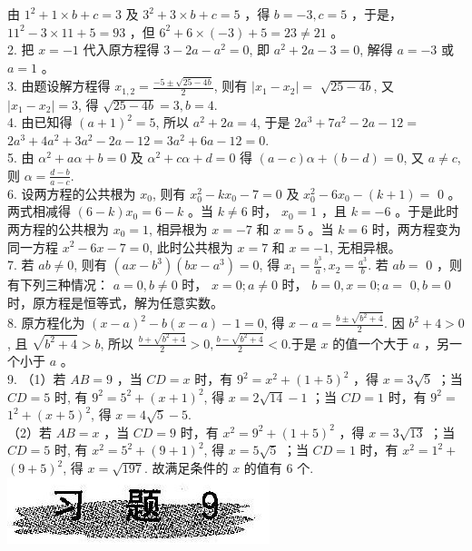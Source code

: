 \documentclass[10pt]{article}
\begin{document}
由 $1^{2}+1 \times b+c=3$ 及 $3^{2}+3 \times b+c=5$ ，得 $b=-3, c=5$ ，于是， $11^{2}-3 \times 11+5=93$ ，但 $6^{2}+6 \times(-3)+5=23 \neq 21$ 。\\
2. 把 $x=-1$ 代入原方程得 $3-2 a-a^{2}=0$, 即 $a^{2}+2 a-3=0$, 解得 $a=-3$ 或 $a=1$ 。\\
3. 由题设解方程得 $x_{1,2}=\frac{-5 \pm \sqrt{25-4 b}}{2}$, 则有 $\left|x_{1}-x_{2}\right|=$ $\sqrt{25-4 b}$, 又 $\left|x_{1}-x_{2}\right|=3$, 得 $\sqrt{25-4 b}=3, b=4$.\\
4. 由已知得 $(a+1)^{2}=5$, 所以 $a^{2}+2 a=4$, 于是 $2 a^{3}+7 a^{2}-2 a-12=$ $2 a^{3}+4 a^{2}+3 a^{2}-2 a-12=3 a^{2}+6 a-12=0$.\\
5. 由 $\alpha^{2}+a \alpha+b=0$ 及 $\alpha^{2}+c \alpha+d=0$ 得 $(a-c) \alpha+(b-d)=0$, 又 $a \neq c$,则 $\alpha=\frac{d-b}{a-c}$.\\
6. 设两方程的公共根为 $x_{0}$, 则有 $x_{0}^{2}-k x_{0}-7=0$ 及 $x_{0}^{2}-6 x_{0}-(k+1)=$ 0 。两式相减得 $(6-k) x_{0}=6-k$ 。当 $k \neq 6$ 时， $x_{0}=1$ ，且 $k=-6$ 。于是此时两方程的公共根为 $x_{0}=1$, 相异根为 $x=-7$ 和 $x=5$ 。当 $k=6$ 时，两方程变为同一方程 $x^{2}-6 x-7=0$, 此时公共根为 $x=7$ 和 $x=-1$, 无相异根。\\
7. 若 $a b \neq 0$, 则有 $\left(a x-b^{3}\right)\left(b x-a^{3}\right)=0$, 得 $x_{1}=\frac{b^{3}}{a}, x_{2}=\frac{a^{3}}{b}$. 若 $a b=$ 0 ，则有下列三种情况： $a=0, b \neq 0$ 时， $x=0 ; a \neq 0$ 时， $b=0, x=0 ; a=$ $0, b=0$ 时，原方程是恒等式，解为任意实数。\\
8. 原方程化为 $(x-a)^{2}-b(x-a)-1=0$, 得 $x-a=\frac{b \pm \sqrt{b^{2}+4}}{2}$. 因 $b^{2}+4>0$, 且 $\sqrt{b^{2}+4}>b$, 所以 $\frac{b+\sqrt{b^{2}+4}}{2}>0, \frac{b-\sqrt{b^{2}+4}}{2}<0$.于是 $x$ 的值一个大于 $a$ ，另一个小于 $a$ 。\\
9. （1）若 $A B=9$ ，当 $C D=x$ 时，有 $9^{2}=x^{2}+(1+5)^{2}$ ，得 $x=3 \sqrt{5}$ ；当 $C D=5$ 时, 有 $9^{2}=5^{2}+(x+1)^{2}$, 得 $x=2 \sqrt{14}-1$ ；当 $C D=1$ 时，有 $9^{2}=$ $1^{2}+(x+5)^{2}$, 得 $x=4 \sqrt{5}-5$.\\
（2）若 $A B=x$ ，当 $C D=9$ 时，有 $x^{2}=9^{2}+(1+5)^{2}$ ，得 $x=3 \sqrt{13}$ ；当 $C D=5$ 时, 有 $x^{2}=5^{2}+(9+1)^{2}$, 得 $x=5 \sqrt{5}$ ；当 $C D=1$ 时，有 $x^{2}=1^{2}+$ $(9+5)^{2}$, 得 $x=\sqrt{197}$. 故满足条件的 $x$ 的值有 6 个.\\
\includegraphics[max width=\textwidth, center]{2024_10_30_26b590fd1106d28139f0g-135}
\end{document}
